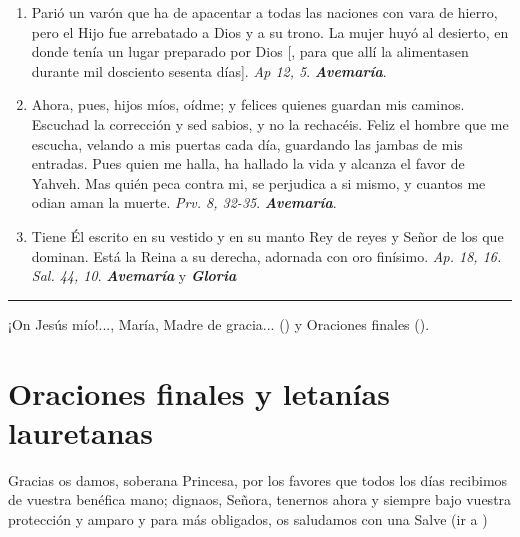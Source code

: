 \documentclass[11pt,a4paper]{book}
\begin{document}
\begin{enumerate}
        \item Parió un varón que ha de apacentar a todas las naciones con vara de hierro, pero el Hijo fue arrebatado a Dios y a su trono. La mujer huyó
            al desierto, en donde tenía un lugar preparado por Dios [, para que allí la alimentasen durante mil dosciento sesenta días]. \emph{Ap 12, 5}. \textbf{\emph{Avemaría}}.

        \item Ahora, pues, hijos míos, oídme; y felices quienes guardan mis caminos. Escuchad la corrección y sed sabios, y no la rechacéis.  
            Feliz el hombre que me escucha, velando a mis puertas cada día, guardando las jambas de mis entradas. Pues quien me halla, ha hallado la vida y alcanza el favor 
            de Yahveh. Mas quién peca contra mi, se perjudica a si mismo, y cuantos me odian aman la muerte. \emph{Prv. 8, 32-35}. \textbf{\emph{Avemaría}}.

        \item Tiene Él escrito en su vestido y en su manto Rey de reyes y Señor de los que dominan. Está la Reina a su derecha, adornada con oro finísimo. 
            \emph{Ap. 18, 16. Sal. 44, 10}. \textbf{\emph{Avemaría}} y \textbf{\emph{Gloria}}
    \end{enumerate}    

    \rule{\textwidth}{0.5pt}
    ¡On Jesús mío!..., María, Madre de gracia... () y Oraciones finales ().

    \section*{Oraciones finales y letanías lauretanas} 
    \label{sec:final-prayer}

    Gracias os damos, soberana Princesa, por los favores que todos los días recibimos de vuestra benéfica mano; dignaos, Señora, tenernos ahora 
    y siempre bajo vuestra protección y amparo y para más obligados, os saludamos con una Salve (ir a )
\end{document}
